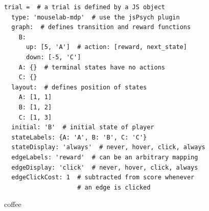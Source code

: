 \documentclass[final]{beamer}
\newlength{\onecolwid}
\newlength{\twocolwid}
\begin{document}
\begin{frame}[t, fragile]
\begin{columns}[t]
\begin{column}{\twocolwid}



  \begin{columns}[t,totalwidth=\twocolwid] %
    
    \begin{column}{\onecolwid} %
      \begin{verbatim}
trial =  # a trial is defined by a JS object
  type: 'mouselab-mdp'  # use the jsPsych plugin
  graph:  # defines transition and reward functions
    B:
      up: [5, 'A']  # action: [reward, next_state]
      down: [-5, 'C']
    A: {}  # terminal states have no actions
    C: {}
  layout:  # defines position of states
    A: [1, 1]
    B: [1, 2]
    C: [1, 3]
  initial: 'B'  # initial state of player
  stateLabels: {A: 'A', B: 'B', C: 'C'}
  stateDisplay: 'always'  # never, hover, click, always
  edgeLabels: 'reward'  # can be an arbitrary mapping
  edgeDisplay: 'click'  # never, hover, click, always
  edgeClickCost: 1  # subtracted from score whenever
                    # an edge is clicked
      \end{verbatim}{coffee}

    \end{column} %

    \begin{column}{\onecolwid} %




\end{column}
\end{columns}
\end{column}
\end{columns}
\end{frame}
\end{document}

